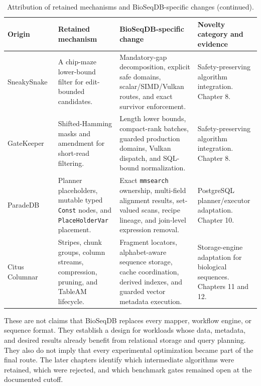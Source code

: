 \clearpage

\begin{table}[H]
  \ContinuedFloat
  \centering
  \scriptsize
  \setlength{\tabcolsep}{3pt}
  \renewcommand{\arraystretch}{0.96}
  \caption[]{Attribution of retained mechanisms and BioSeqDB-specific
    changes (continued).}
  \begin{tabularx}{\linewidth}{p{.19\linewidth}p{.20\linewidth}
                               p{.29\linewidth}X}
    \toprule
    Origin & Retained mechanism & BioSeqDB-specific change &
    Novelty category and evidence \\
    \midrule
    SneakySnake~\cite{sneakysnake_paper} &
    A chip-maze lower-bound filter for edit-bounded candidates. &
    Mandatory-gap decomposition, explicit safe domains, scalar/SIMD/Vulkan
    routes, and exact survivor enforcement. &
    Safety-preserving algorithm integration. Chapter 8. \\
    GateKeeper~\cite{gatekeeper_paper,gatekeeper_gpu_paper} &
    Shifted-Hamming masks and amendment for short-read filtering. &
    Length lower bounds, compact-rank batches, guarded production domains,
    Vulkan dispatch, and SQL-bound normalization. &
    Safety-preserving algorithm integration. Chapter 8. \\
    ParadeDB~\cite{paradedb_pg_search_customscan} &
    Planner placeholders, mutable typed \texttt{Const} nodes, and
    \texttt{PlaceHolderVar} placement. &
    Exact \texttt{mmsearch} ownership, multi-field alignment results,
    set-valued scans, recipe lineage, and join-level expression removal. &
    PostgreSQL planner/executor adaptation. Chapter 10. \\
    Citus Columnar~\cite{citus_columnar_storage} &
    Stripes, chunk groups, column streams, compression, pruning, and TableAM
    lifecycle. &
    Fragment locators, alphabet-aware sequence storage, cache coordination,
    derived indexes, and guarded vector metadata execution. &
    Storage-engine adaptation for biological sequences. Chapters 11 and 12. \\
    \bottomrule
  \end{tabularx}
\end{table}

These are not claims that BioSeqDB replaces every mapper, workflow engine,
or sequence format.  They establish a design for workloads whose data,
metadata, and desired results already benefit from relational storage and
query planning.  They also do not imply that every experimental
optimization became part of the final route.  The later chapters identify
which intermediate algorithms were retained, which were rejected, and
which benchmark gates remained open at the documented cutoff.

